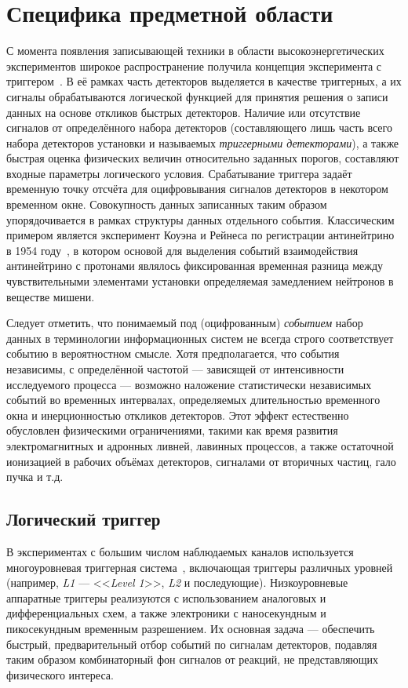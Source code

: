 \section{Специфика предметной области}

С момента появления записывающей техники в области высокоэнергетических
экспериментов широкое распространение получила концепция эксперимента с
триггером~\cite{nucl-exp-methods-Grigorev1988}. В её рамках часть
детекторов выделяется в качестве триггерных,
а их сигналы обрабатываются логической функцией для принятия решения о записи
данных на основе откликов быстрых детекторов. Наличие или отсутствие сигналов
от определённого набора детекторов (составляющего лишь часть всего набора
детекторов установки и называемых \emph{триггерными детекторами}),
а также быстрая оценка физических величин
относительно заданных порогов, составляют входные параметры логического
условия. Срабатывание триггера задаёт временную точку отсчёта для
оцифровывания сигналов детекторов в некотором временном окне.
Совокупность данных записанных таким образом упорядочивается в рамках
структуры данных отдельного события. Классическим примером является
эксперимент Коуэна и Рейнеса по регистрации антинейтрино в
1954 году~\cite{cowan1956detection},
в котором основой для выделения событий взаимодействия антинейтрино с
протонами являлось фиксированная временная разница между чувствительными
элементами установки определяемая замедлением нейтронов в веществе
мишени.

Следует отметить, что понимаемый под (оцифрованным) \emph{событием}
набор данных в терминологии информационных систем не всегда строго
соответствует событию в вероятностном смысле. Хотя предполагается,
что события независимы, с определённой частотой — зависящей от
интенсивности исследуемого процесса — возможно наложение статистически
независимых событий во временных интервалах, определяемых длительностью
временного окна и инерционностью откликов детекторов. Этот эффект
естественно обусловлен физическими ограничениями, такими как время развития
электромагнитных и адронных ливней, лавинных процессов, а также
остаточной ионизацией в рабочих объёмах детекторов, сигналами от
вторичных частиц, гало пучка и т.д.

\subsection{Логический триггер}

В экспериментах с большим числом наблюдаемых каналов используется
многоуровневая триггерная система~\cite{nucl-exp-methods-Grigorev1988},
включающая триггеры различных
уровней (например, \emph{L1} — <<\emph{Level 1}>>, \emph{L2} и
последующие). Низкоуровневые аппаратные триггеры реализуются с
использованием аналоговых и дифференциальных схем, а также электроники
с наносекундным и пикосекундным временным разрешением. Их основная
задача --- обеспечить быстрый, предварительный отбор событий по сигналам
детекторов, подавляя таким образом комбинаторный фон сигналов от реакций,
не представляющих физического интереса.


